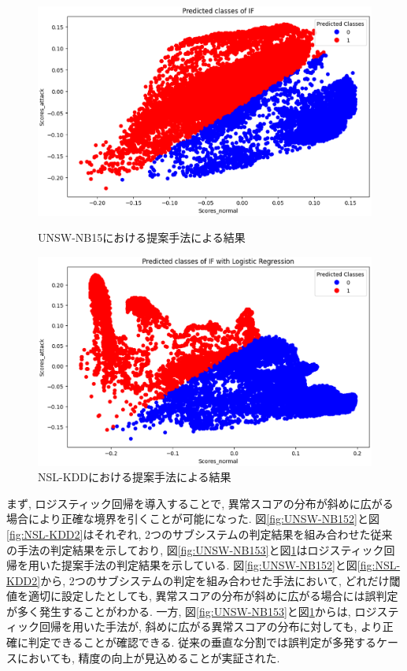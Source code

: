 \documentclass{css}
\begin{document}
\begin{figure}[ht]
    \centering
    \begin{minipage}{0.9\linewidth}
        \centering
        \includegraphics[width=\linewidth]{pictures/eps/UNSW-NB153.eps}
        \caption{UNSW-NB15における提案手法による結果}
        \label{fig:UNSW-NB153}
    \end{minipage}
    \vfill{} 
    \begin{minipage}{0.9\linewidth}
        \centering
        \includegraphics[width=\linewidth]{pictures/eps/NSL-KDD3.eps}
        \caption{NSL-KDDにおける提案手法による結果}
        \label{fig:NSL-KDD3}
    \end{minipage}
\end{figure}

まず, ロジスティック回帰を導入することで, 異常スコアの分布が斜めに広がる場合により正確な境界を引くことが可能になった. 図\ref{fig:UNSW-NB152}と図\ref{fig:NSL-KDD2}はそれぞれ, 2つのサブシステムの判定結果を組み合わせた従来の手法の判定結果を示しており, 図\ref{fig:UNSW-NB153}と図\ref{fig:NSL-KDD3}はロジスティック回帰を用いた提案手法の判定結果を示している. 図\ref{fig:UNSW-NB152}と図\ref{fig:NSL-KDD2}から, 2つのサブシステムの判定を組み合わせた手法において, どれだけ閾値を適切に設定したとしても, 異常スコアの分布が斜めに広がる場合には誤判定が多く発生することがわかる. 一方, 図\ref{fig:UNSW-NB153}と図\ref{fig:NSL-KDD3}からは, ロジスティック回帰を用いた手法が, 斜めに広がる異常スコアの分布に対しても, より正確に判定できることが確認できる. 従来の垂直な分割では誤判定が多発するケースにおいても, 精度の向上が見込めることが実証された. 
\end{document}
